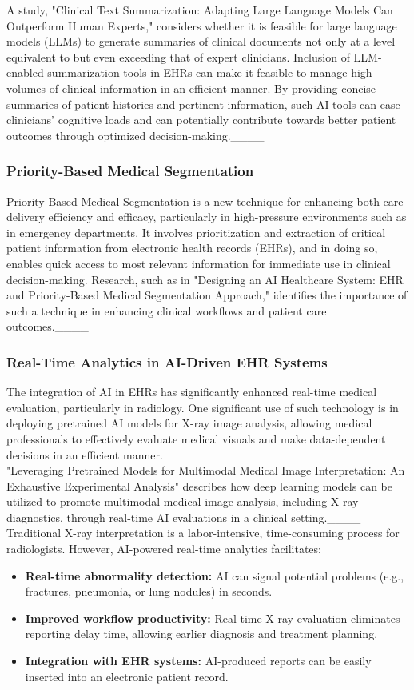 A study, "Clinical Text Summarization: Adapting Large Language Models Can Outperform Human Experts," considers whether it is feasible for large language models (LLMs) to generate summaries of clinical documents not only at a level equivalent to but even exceeding that of expert clinicians. Inclusion of LLM-enabled summarization tools in EHRs can make it feasible to manage high volumes of clinical information in an efficient manner. By providing concise summaries of patient histories and pertinent information, such AI tools can ease clinicians' cognitive loads and can potentially contribute towards better patient outcomes through optimized decision-making.____
\subsubsection{Priority-Based Medical Segmentation}
Priority-Based Medical Segmentation is a new technique for enhancing both care delivery efficiency and efficacy, particularly in high-pressure environments such as in emergency departments. It involves prioritization and extraction of critical patient information from electronic health records (EHRs), and in doing so, enables quick access to most relevant information for immediate use in clinical decision-making. Research, such as in "Designing an AI Healthcare System: EHR and Priority-Based Medical Segmentation Approach," identifies the importance of such a technique in enhancing clinical workflows and patient care outcomes.____
\subsubsection{Real-Time Analytics in AI-Driven EHR Systems}
The integration of AI in EHRs has significantly enhanced real-time medical evaluation, particularly in radiology. One significant use of such technology is in deploying pretrained AI models for X-ray image analysis, allowing medical professionals to effectively evaluate medical visuals and make data-dependent decisions in an efficient manner.\\
"Leveraging Pretrained Models for Multimodal Medical Image Interpretation: An Exhaustive Experimental Analysis" describes how deep learning models can be utilized to promote multimodal medical image analysis, including X-ray diagnostics, through real-time AI evaluations in a clinical setting.____\\
Traditional X-ray interpretation is a labor-intensive, time-consuming process for radiologists. However, AI-powered real-time analytics facilitates:
\begin{itemize}
    \item \textbf{Real-time abnormality detection:} AI can signal potential problems (e.g., fractures, pneumonia, or lung nodules) in seconds.
    \item \textbf{Improved workflow productivity:} Real-time X-ray evaluation eliminates reporting delay time, allowing earlier diagnosis and treatment planning.
    \item \textbf{Integration with EHR systems:} AI-produced reports can be easily inserted into an electronic patient record.
\end{itemize}
